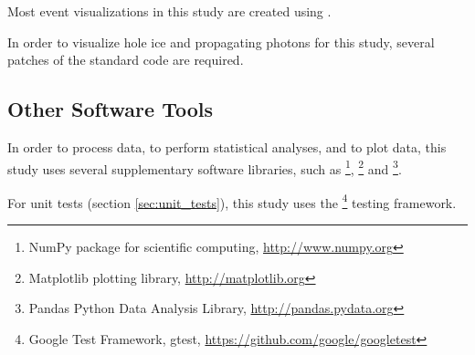 Most event visualizations in this study are created using \steamshovel.

In order to visualize hole ice and propagating photons for this study, several patches of the standard \steamshovel code are required.



\subsection{Other Software Tools}

In order to process data, to perform statistical analyses, and to plot data, this study uses several supplementary software libraries, such as \footnote{NumPy package for scientific computing, \url{http://www.numpy.org}}, \footnote{Matplotlib plotting library, \url{http://matplotlib.org}} and \footnote{Pandas Python Data Analysis Library, \url{http://pandas.pydata.org}}.


For unit tests (section \ref{sec:unit_tests}), this study uses the \footnote{Google Test Framework, gtest, \url{https://github.com/google/googletest}} testing framework.

